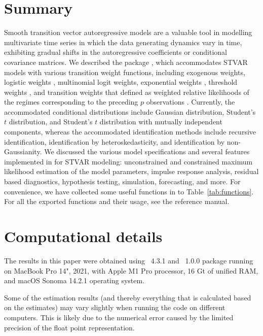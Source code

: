 \documentclass[nojss]{jss}
\begin{document}
\section{Summary}\label{sec:summary}
Smooth transition vector autoregressive models are a valuable tool in modelling multivariate time series in which the data generating dynamics vary in time, exhibiting gradual shifts in the autoregressive coefficients or conditional covariance matrices. We described the  package , which accommodates STVAR models with various transition weight functions, including exogenous weights, logistic weights \citep{Anderson+Vahid:1998}, multinomial logit weights, exponential weights \citep[e.g.,][]{Hubrich+Terasvirta:2013}, threshold weights \citep{Tsay:1998}, and transition weights that defined as weighted relative likelihoods of the regimes corresponding to the preceding $p$ observations \citep{Lanne+Virolainen:2024}. Currently, the accommodated conditional distributions include Gaussian distribution, Student's $t$ distribution, and Student's $t$ distribution with mutually independent components, whereas the accommodated identification methods include recursive identification, identification by heteroskedasticity, and identification by non-Gaussianity. We discussed the various model specifications and several features implemented in  for STVAR modeling: unconstrained and constrained maximum likelihood estimation of the model parameters, impulse response analysis, residual based diagnostics, hypothesis testing, simulation, forecasting, and more. For convenience, we have collected some useful functions in  to Table~\ref{tab:functions}. For all the exported functions and their usage, see the reference manual.

\section*{Computational details}
The results in this paper were obtained using ~4.3.1 and ~1.0.0 package running on MacBook Pro 14", 2021, with Apple M1 Pro processor, 16 Gt of unified RAM, and macOS Sonoma 14.2.1 operating system.

Some of the estimation results (and thereby everything that is calculated based on the estimates) may vary slightly when running the code on different computers. This is likely due to the numerical error caused by the limited precision of the float point representation.

\pagebreak

\end{document}
